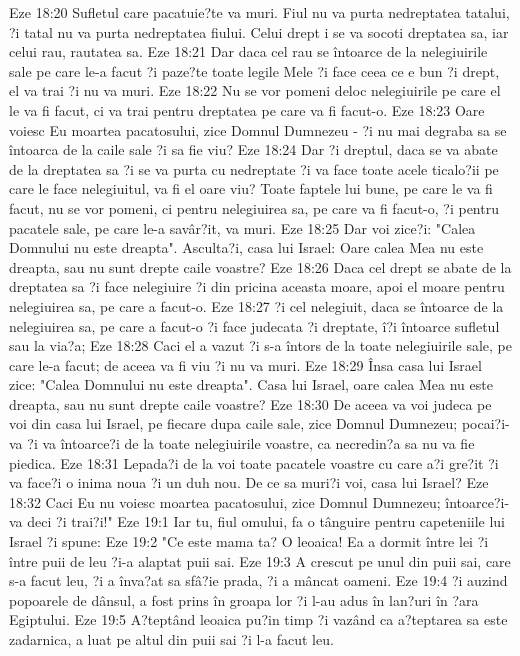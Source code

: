 Eze 18:20  Sufletul care pacatuie?te va muri. Fiul nu va purta nedreptatea tatalui, ?i tatal nu va purta nedreptatea fiului. Celui drept i se va socoti dreptatea sa, iar celui rau, rautatea sa.
Eze 18:21  Dar daca cel rau se întoarce de la nelegiuirile sale pe care le-a facut ?i paze?te toate legile Mele ?i face ceea ce e bun ?i drept, el va trai ?i nu va muri.
Eze 18:22  Nu se vor pomeni deloc nelegiuirile pe care el le va fi facut, ci va trai pentru dreptatea pe care va fi facut-o.
Eze 18:23  Oare voiesc Eu moartea pacatosului, zice Domnul Dumnezeu - ?i nu mai degraba sa se întoarca de la caile sale ?i sa fie viu?
Eze 18:24  Dar ?i dreptul, daca se va abate de la dreptatea sa ?i se va purta cu nedreptate ?i va face toate acele ticalo?ii pe care le face nelegiuitul, va fi el oare viu? Toate faptele lui bune, pe care le va fi facut, nu se vor pomeni, ci pentru nelegiuirea sa, pe care va fi facut-o, ?i pentru pacatele sale, pe care le-a savâr?it, va muri.
Eze 18:25  Dar voi zice?i: "Calea Domnului nu este dreapta". Asculta?i, casa lui Israel: Oare calea Mea nu este dreapta, sau nu sunt drepte caile voastre?
Eze 18:26  Daca cel drept se abate de la dreptatea sa ?i face nelegiuire ?i din pricina aceasta moare, apoi el moare pentru nelegiuirea sa, pe care a facut-o.
Eze 18:27  ?i cel nelegiuit, daca se întoarce de la nelegiuirea sa, pe care a facut-o ?i face judecata ?i dreptate, î?i întoarce sufletul sau la via?a;
Eze 18:28  Caci el a vazut ?i s-a întors de la toate nelegiuirile sale, pe care le-a facut; de aceea va fi viu ?i nu va muri.
Eze 18:29  Însa casa lui Israel zice: "Calea Domnului nu este dreapta". Casa lui Israel, oare calea Mea nu este dreapta, sau nu sunt drepte caile voastre?
Eze 18:30  De aceea va voi judeca pe voi din casa lui Israel, pe fiecare dupa caile sale, zice Domnul Dumnezeu; pocai?i-va ?i va întoarce?i de la toate nelegiuirile voastre, ca necredin?a sa nu va fie piedica.
Eze 18:31  Lepada?i de la voi toate pacatele voastre cu care a?i gre?it ?i va face?i o inima noua ?i un duh nou. De ce sa muri?i voi, casa lui Israel?
Eze 18:32  Caci Eu nu voiesc moartea pacatosului, zice Domnul Dumnezeu; întoarce?i-va deci ?i trai?i!"
Eze 19:1  Iar tu, fiul omului, fa o tânguire pentru capeteniile lui Israel ?i spune:
Eze 19:2  "Ce este mama ta? O leoaica! Ea a dormit între lei ?i între puii de leu ?i-a alaptat puii sai.
Eze 19:3  A crescut pe unul din puii sai, care s-a facut leu, ?i a înva?at sa sfâ?ie prada, ?i a mâncat oameni.
Eze 19:4  ?i auzind popoarele de dânsul, a fost prins în groapa lor ?i l-au adus în lan?uri în ?ara Egiptului.
Eze 19:5  A?teptând leoaica pu?in timp ?i vazând ca a?teptarea sa este zadarnica, a luat pe altul din puii sai ?i l-a facut leu.
